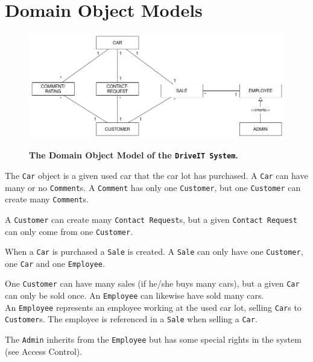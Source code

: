 \section{Domain Object Models}
\begin{figure}[H]
	\centering
		\includegraphics[scale=0.35]{Figures/DomainObjectModel}\\
	\caption{\textbf{The Domain Object Model of the \texttt{DriveIT System}.}}
  \label{fig:DomainObjectModel}
\end{figure}

The \texttt{Car} object is a given used car that the car lot has purchased. A \texttt{Car} can have many or no \texttt{Comment}s. A \texttt{Comment} has only one \texttt{Customer}, but one \texttt{Customer} can create many \texttt{Comment}s.

A \texttt{Customer} can create many \texttt{Contact Request}s, but a given \texttt{Contact Request} can only come from one \texttt{Customer}.

When a  \texttt{Car} is purchased a \texttt{Sale} is created. A \texttt{Sale} can only have one \texttt{Customer}, one \texttt{Car} and one \texttt{Employee}.

One \texttt{Customer} can have many sales (if he/she buys many cars), but a given \texttt{Car} can only be sold once. An \texttt{Employee} can likewise have sold many cars.\\ 
An \texttt{Employee} represents an employee working at the used car lot, selling \texttt{Car}s to \texttt{Customer}s. The employee is referenced in a \texttt{Sale} when selling a \texttt{Car}.  

The \texttt{Admin} inherits from the \texttt{Employee} but has some special rights in the system (see Access Control).